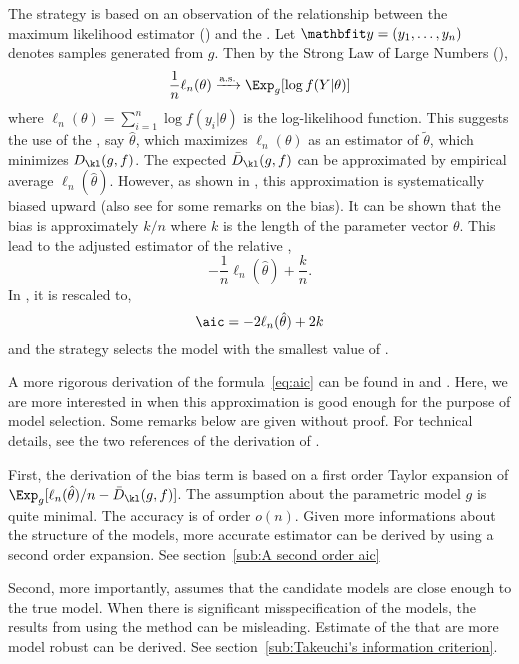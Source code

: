 The \aic strategy is based on an observation of the relationship between the
maximum likelihood estimator (\mle) and the \kld. Let $\data =
(y_1,\dots,y_n)$ denotes \iid samples generated from $g$. Then by the Strong
Law of Large Numbers (\slln),
\begin{equation}
  \frac{1}{n}\ell_n(\theta) \xrightarrow{\text{a.s.}} \Exp_g[\log f(Y|\theta)]
  \label{eq:ml convergence}
\end{equation}
where $\ell_n(\theta) = \sum_{i=1}^n \log f(y_i|\theta)$ is the log-likelihood
function. This suggests the use of the \mle, say $\hat\theta$, which maximizes
$\ell_n(\theta)$ as an estimator of $\tilde\theta$, which minimizes
$D_{\kl}(g,f)$. The expected \kld $\bar{D}_{\kl}(g,f)$ can be approximated by
empirical average $\ell_n(\hat\theta)$. However, as shown in
\cite{Akaike:1973uc}, this approximation is systematically biased upward (also
see \cite[][sec.~2.3]{Claeskens:2008tq} for some remarks on the bias). It can
be shown that the bias is approximately $k/n$ where $k$ is the length of the
parameter vector $\theta$. This lead to the adjusted estimator of the relative
\kld,
\begin{equation}
  -\frac{1}{n}\ell_n(\hat\theta) + \frac{k}{n}.
\end{equation}
In \cite{Akaike:1973uc}, it is rescaled to,
\begin{equation}
  \aic = -2\ell_n(\hat\theta) + 2k
  \label{eq:aic}
\end{equation}
and the \aic strategy selects the model with the smallest value of \aic.

A more rigorous derivation of the formula~\eqref{eq:aic} can be found in
\cite[][sec.~2.3]{Claeskens:2008tq} and \cite[][sec.~6.2]{Burnham:2002wc}.
Here, we are more interested in when this approximation is good enough for the
purpose of model selection. Some remarks below are given without proof. For
technical details, see the two references of the derivation of \aic.

First, the derivation of the bias term is based on a first order Taylor
expansion of $\Exp_g[\ell_n(\hat\theta)/n - \bar{D}_{\kl}(g,f)]$. The
assumption about the parametric model $g$ is quite minimal. The accuracy is of
order $o(n)$. Given more informations about the structure of the models, more
accurate estimator can be derived by using a second order expansion. See
section~\ref{sub:A second order aic}

Second, more importantly, \aic assumes that the candidate models are close
enough to the true model. When there is significant misspecification of the
models, the results from using the \aic method can be misleading. Estimate of
the \kld that are more model robust can be derived. See
section~\ref{sub:Takeuchi's information criterion}.

